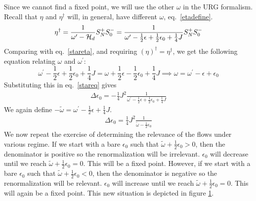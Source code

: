 \documentclass[12pt,twoside]{article}
\numberwithin{equation}{section}
\begin{document}
\begin{figure}
	\label{star3}
\end{figure}
\pb Since we cannot find a fixed point, we will use the other \(\omega\) in the URG formalism. Recall that \(\eta\) and \(\eta^\dagger\) will, in general, have different \(\omega\), eq.~\ref{etadefine}.
\begin{equation}
	\eta^\dagger = \frac{1}{\omega^\prime - \mathcal{H}_d}S_N^+ S_0^- = \frac{1}{\omega^\prime - \frac{1}{2}\epsilon + \frac{1}{2}\epsilon_0 + \frac{1}{4}J}S_N^+ S_0^-
\end{equation}
Comparing with eq.~\ref{stareta}, and requiring \(\left(\eta\right)^\dagger = \eta^\dagger\), we get the following equation relating \(\omega\) and \(\omega^\prime\):
\begin{equation}
	\omega^\prime - \frac{1}{2}\epsilon + \frac{1}{2}\epsilon_0 + \frac{1}{4}J = \omega + \frac{1}{2}\epsilon - \frac{1}{2}\epsilon_0 + \frac{1}{4}J \implies \omega = \omega^\prime - \epsilon + \epsilon_0
\end{equation}
Substituting this in eq.~\ref{stareq} gives
\begin{equation}\begin{aligned}
	\Delta \epsilon_0 = -\frac{1}{4}J^2 \frac{1}{\omega^\prime - \frac{1}{2}\epsilon + \frac{1}{2}\epsilon_0 + \frac{1}{4}J}
\end{aligned}\end{equation}
We again define \(-\tilde \omega = \omega^\prime - \frac{1}{2}\epsilon + \frac{1}{4}J\).
\begin{equation}\begin{aligned}
	\Delta \epsilon_0 = \frac{1}{4}J^2 \frac{1}{\tilde \omega - \frac{1}{2}\epsilon_0}
\end{aligned}\end{equation}
We now repeat the exercise of determining the relevance of the flows under various regime. If we start with a bare \(\epsilon_0\) such that \(\tilde \omega + \frac{1}{2}\epsilon_0 > 0\), then the denominator is positive so the renormalization will be irrelevant. \(\epsilon_0\) will decrease until we reach \(\tilde \omega + \frac{1}{2}\epsilon_0 = 0\). This will be a fixed point. However, if we start with a bare \(\epsilon_0\) such that \(\tilde \omega + \frac{1}{2}\epsilon_0 < 0\), then the denominator is negative so the renormalization will be relevant. \(\epsilon_0\) will increase until we reach \(\tilde \omega + \frac{1}{2}\epsilon_0 = 0\). This will again be a fixed point. This new situation is depicted in figure \ref{star3}.
\end{document}
